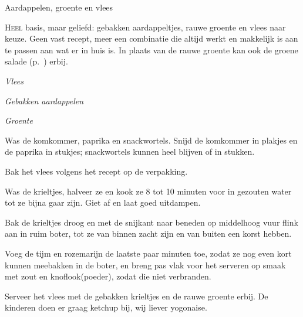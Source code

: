 \begin{recipe}{Aardappelen, groente en vlees}
\label{recipe:aardappel-groente-vlees}


\lettrine{H}{eel} basis, maar geliefd: gebakken aardappeltjes, rauwe groente en
vlees naar keuze. Geen vast recept, meer een combinatie die altijd werkt en
makkelijk is aan te passen aan wat er in huis is. In plaats van de rauwe
groente kan ook de groene salade (p.~\pageref{recipe:groene-salade}) erbij.

\noindent\textit{Vlees}

{\small\setlength{\parindent}{0pt}
\par}

\medskip
\noindent\textit{Gebakken aardappelen}
\begin{ingredients}
\end{ingredients}

\medskip
\noindent\textit{Groente}
\begin{ingredients}
\end{ingredients}

\begin{steps}
  \item Was de komkommer, paprika en snackwortels. Snijd de komkommer in
        plakjes en de paprika in stukjes; snackwortels kunnen heel blijven of
        in stukken.
  \item Bak het vlees volgens het recept op de verpakking.
  \item Was de krieltjes, halveer ze en kook ze 8 tot 10 minuten voor in gezouten
        water tot ze bijna gaar zijn. Giet af en laat goed uitdampen.
  \item Bak de krieltjes droog en met de snijkant naar beneden op middelhoog
        vuur flink aan in ruim boter, tot ze van binnen zacht zijn en van
        buiten een korst hebben.
  \item Voeg de tijm en rozemarijn de laatste paar minuten toe, zodat ze nog
        even kort kunnen meebakken in de boter, en breng pas vlak voor het
        serveren op smaak met zout en knoflook(poeder), zodat die niet
        verbranden.
  \item Serveer het vlees met de gebakken krieltjes en de rauwe groente
        erbij. De kinderen doen er graag ketchup bij, wij liever yogonaise.
\end{steps}

\end{recipe}
